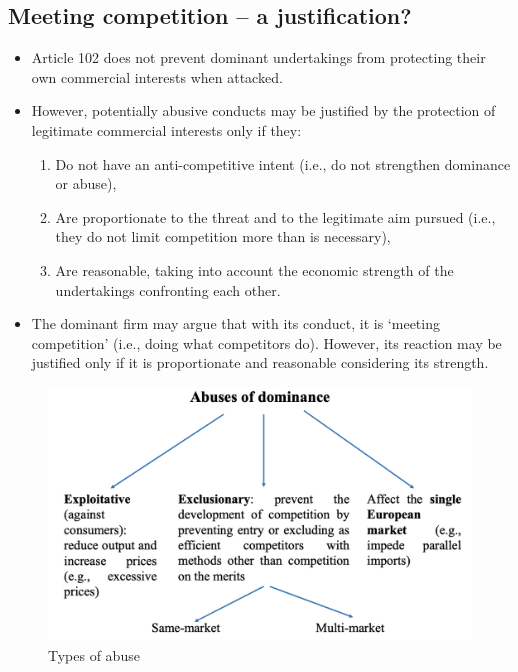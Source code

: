     \subsection{Meeting competition – a justification?}

        \begin{itemize}
            \item Article 102 does not prevent dominant undertakings from protecting their own commercial interests when attacked.
            \item However, potentially abusive conducts may be justified by the protection of legitimate commercial interests only if they:
            \begin{enumerate}
                \item Do not have an anti-competitive intent (i.e., do not strengthen dominance or abuse),
                \item Are proportionate to the threat and to the legitimate aim pursued (i.e., they do not limit competition more than is necessary),
                \item Are reasonable, taking into account the economic strength of the undertakings confronting each other.
            \end{enumerate}
            \item The dominant firm may argue that with its conduct, it is ‘meeting competition’ (i.e., doing what competitors do). However, its reaction may be justified only if it is proportionate and reasonable considering its strength.
        \end{itemize}

    \begin{center}
        \begin{figure}[h]
            \centering
            \includegraphics[width=0.6\linewidth]{graphics/L10-1_types of abuses.png}
            \caption{Types of abuse}
        \end{figure}
    \end{center}

